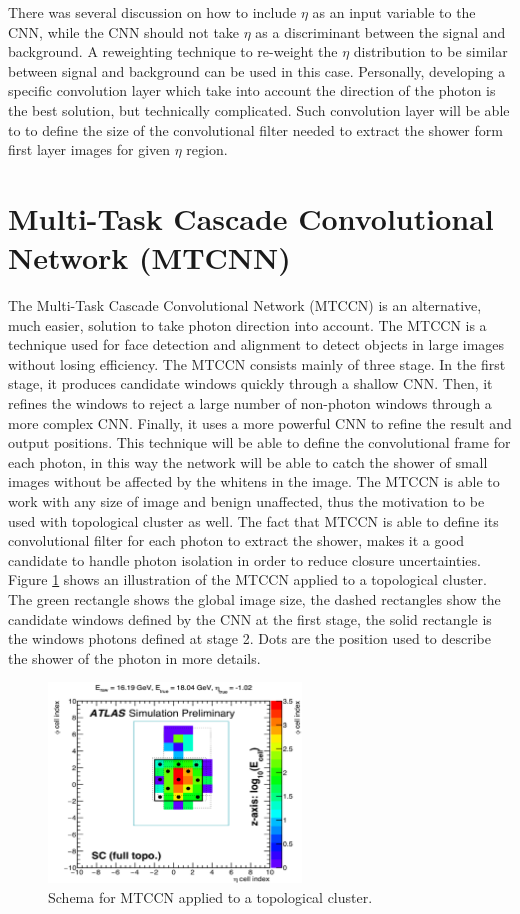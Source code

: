 There was several discussion on how to include $\eta$ as an input variable to the CNN, while the CNN should not take $\eta$ as a discriminant between the signal and background. A reweighting technique to re-weight the $\eta$ distribution to be similar between signal and background can be used in this case. Personally, developing a specific convolution layer which take into account the direction of the photon is the best solution, but technically complicated. Such convolution layer will be able to to define the size of the convolutional filter needed to extract the shower form first layer images for given $\eta$ region. \\

\section{Multi-Task Cascade Convolutional Network (MTCNN)}

The Multi-Task Cascade Convolutional Network (MTCCN) is an alternative, much easier, solution to take photon direction into account. The MTCCN is a technique used for face detection and alignment to detect objects in large images without losing efficiency. The MTCCN consists mainly of three stage. In the first stage, it produces candidate windows quickly through a shallow CNN. Then,  it  refines the windows to reject a large number of non-photon windows through a more complex CNN. Finally, it uses a more powerful CNN to refine the result and output positions. This technique will be able to define the convolutional frame for each photon, in this way the network will be able to catch the shower of small images without be affected by the whitens in the image. The MTCCN is able to work with any size of image and benign unaffected, thus the motivation to be used with topological cluster as well. The fact that MTCCN is able to define its convolutional filter for each photon to extract the shower, makes it a good candidate to handle photon isolation in order to reduce closure uncertainties. Figure \ref{fig:Adx3:MTCCN} shows an illustration of the MTCCN applied to a topological cluster. The green rectangle shows the global image size, the dashed rectangles show the candidate windows defined by the CNN at the first stage, the solid rectangle is the windows photons defined at stage 2. Dots are the position used to describe the shower of the photon in more details. 
\begin{figure}[htbp]
    \centering
    \includegraphics[width=0.6\textwidth]{Adx/Adx3/Img/MTCCN.png}
    \caption{Schema for MTCCN applied to a topological cluster.}
    \label{fig:Adx3:MTCCN}
\end{figure}

